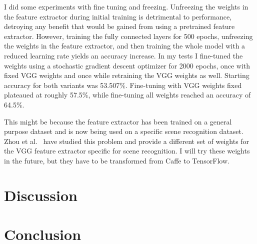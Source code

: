 \documentclass[11pt]{article}
\newcommand{\tf}{TensorFlow}
\begin{document}
I did some experiments with fine tuning and freezing.
Unfreezing the weights in the feature extractor during initial training is detrimental to performance, detroying any benefit that would be gained from using a pretrained feature extractor.
However, training the fully connected layers for 500 epochs, unfreezing the weights in the feature extractor, and then training the whole model with a reduced learning rate yields an accuracy increase.
In my tests I fine-tuned the weights using a stochastic gradient descent optimizer for 2000 epochs, once with fixed VGG weights and once while retraining the VGG weights as well.
Starting accuracy for both variants was 53.507\%.
Fine-tuning with VGG weights fixed plateaued at roughly 57.5\%, while fine-tuning all weights reached an accuracy of 64.5\%.

This might be because the feature extractor has been trained on a general purpose dataset and is now being used on a specific scene recognition dataset.
Zhou et al.~\cite{zhou_learning_2014} have studied this problem and provide a different set of weights for the VGG feature extractor specific for scene recognition.
I will try these weights in the future, but they have to be transformed from Caffe to \tf{}.

\section{Discussion}
\label{sec:discussion}

\section{Conclusion}
\label{sec:conclusion}



\end{document}
